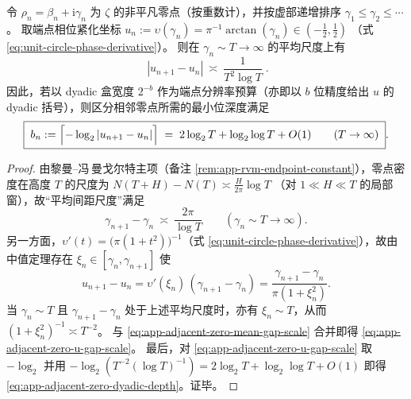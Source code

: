 \begin{proposition}\label{prop:app-adjacent-zero-dyadic-resolution}
令 \(\rho_n=\beta_n+\mathrm{i}\gamma_n\) 为 \(\zeta\) 的非平凡零点（按重数计），并按虚部递增排序 \(\gamma_1\le \gamma_2\le\cdots\)。
取端点相位紧化坐标
\(
u_n:=\upsilon(\gamma_n)=\pi^{-1}\arctan(\gamma_n)\in(-\tfrac12,\tfrac12)
\)
（式 \eqref{eq:unit-circle-phase-derivative}）。
则在 \(\gamma_n\sim T\to\infty\) 的平均尺度上有
\begin{equation}\label{eq:app-adjacent-zero-u-gap-scale}
\boxed{\;
|u_{n+1}-u_n|\ \asymp\ \frac{1}{T^{2}\log T}\; }.
\end{equation}
因此，若以 dyadic 盒宽度 \(2^{-b}\) 作为端点分辨率预算（亦即以 \(b\) 位精度给出 \(u\) 的 dyadic 括号），则区分相邻零点所需的最小位深度满足
\begin{equation}\label{eq:app-adjacent-zero-dyadic-depth}
\boxed{\;
b_{n}:=\Bigl\lceil-\log_{2}|u_{n+1}-u_n|\Bigr\rceil
\;=\;2\log_{2}T+\log_{2}\log T+O(1)\qquad(T\to\infty)\; }.
\end{equation}
\end{proposition}

\begin{proof}
由黎曼--冯\,曼戈尔特主项（备注 \ref{rem:app-rvm-endpoint-constant}），零点密度在高度 \(T\) 的尺度为
\(
N(T+H)-N(T)\asymp \frac{H}{2\pi}\log T
\)
（对 \(1\ll H\ll T\) 的局部窗），故“平均间距尺度”满足
\begin{equation}\label{eq:app-adjacent-zero-mean-gap-scale}
\gamma_{n+1}-\gamma_n\ \asymp\ \frac{2\pi}{\log T}
\qquad(\gamma_n\sim T\to\infty).
\end{equation}
另一方面，\(\upsilon'(t)=\bigl(\pi(1+t^2)\bigr)^{-1}\)（式 \eqref{eq:unit-circle-phase-derivative}），故由中值定理存在 \(\xi_n\in[\gamma_n,\gamma_{n+1}]\) 使
\[
u_{n+1}-u_n=\upsilon'(\xi_n)\,(\gamma_{n+1}-\gamma_n)
=\frac{\gamma_{n+1}-\gamma_n}{\pi(1+\xi_n^{2})}.
\]
当 \(\gamma_n\sim T\) 且 \(\gamma_{n+1}-\gamma_n\) 处于上述平均尺度时，亦有 \(\xi_n\sim T\)，从而 \((1+\xi_n^2)^{-1}\asymp T^{-2}\)。
与 \eqref{eq:app-adjacent-zero-mean-gap-scale} 合并即得 \eqref{eq:app-adjacent-zero-u-gap-scale}。
最后，对 \eqref{eq:app-adjacent-zero-u-gap-scale} 取 \(-\log_2\) 并用 \(-\log_2(T^{-2}(\log T)^{-1})=2\log_2 T+\log_2\log T+O(1)\) 即得 \eqref{eq:app-adjacent-zero-dyadic-depth}。证毕。
\end{proof}

